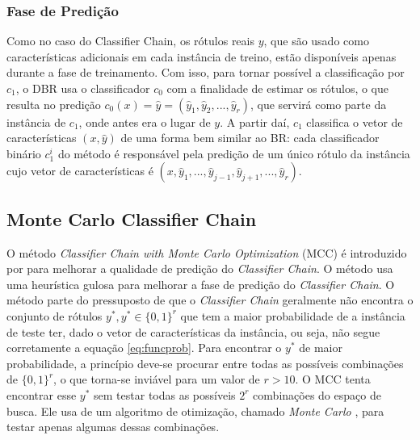   \subsubsection{Fase de Predição}
  Como no caso do Classifier Chain, os rótulos reais $y$, que são usado como características adicionais em cada instância de treino,
 estão disponíveis apenas durante a fase de treinamento.
 Com isso, para tornar possível a classificação por $c_1$, o DBR usa o classificador $c_0$ com a finalidade de
 estimar os rótulos, %
 o que resulta no predição $c_0(x)=\hat{y}=(\hat{y}_1,\hat{y}_2,...,\hat{y}_r)$, que servirá como parte da instância de $c_1$,
 onde antes era o lugar de $y$. 
 A partir daí, $c_1$ classifica o vetor de características $(x,\hat{y})$ de uma forma bem similar ao BR:
 cada classificador binário $c_1^i$ do método é responsável pela predição de um único rótulo da instância
 cujo vetor de características é $(x,\hat{y}_1,...,\hat{y}_{j-1},\hat{y}_{j+1},...,\hat{y}_r)$.

\subsection{Monte Carlo Classifier Chain}


O método \textit{Classifier Chain with Monte Carlo Optimization} (MCC) é introduzido
por \cite{mcc2012} para melhorar a qualidade de predição do \textit{Classifier Chain}.
O método usa uma heurística gulosa para melhorar a fase de predição do \textit{Classifier Chain}.
O método parte do pressuposto de que o \textit{Classifier Chain} geralmente não encontra
o conjunto de rótulos $y^*,y^* \in {\{0,1\}}^r$ que tem a maior probabilidade de a instância de teste ter,
dado o vetor de características da instância, ou seja, não segue corretamente a equação \ref{eq:funcprob}.
Para encontrar o $y^*$ de maior probabilidade, a princípio deve-se procurar entre todas as possíveis
combinações de ${\{0,1\}}^r$, o que torna-se inviável para um valor de $r>10$.
O MCC tenta encontrar esse $y^*$ sem testar todas as possíveis $2^r$ combinações do espaço de busca.
Ele usa de um algoritmo de otimização, chamado \textit{Monte Carlo} \cite{montecarlo}, para
testar apenas algumas dessas combinações.



 

